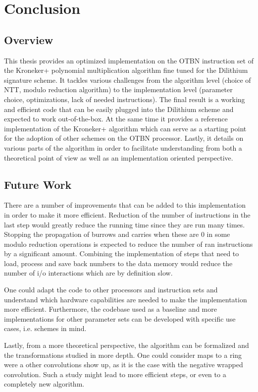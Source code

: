 \chapter{Conclusion}\label{chapter:conclusion}

\section{Overview}

This thesis provides an optimized implementation on the OTBN instruction set of the Kroneker+ polynomial multiplication algorithm fine tuned for the Dilithium signature scheme. It tackles various challenges from the algorithm level (choice of NTT, modulo reduction algorithm) to the implementation level (parameter choice, optimizations, lack of needed instructions). The final result is a working and efficient code that can be easily plugged into the Dilithium scheme and expected to work out-of-the-box. At the same time it provides a reference implementation of the Kroneker+ algorithm which can serve as a starting point for the adoption of other schemes on the OTBN processor. Lastly, it details on various parts of the algorithm in order to facilitate understanding from both a theoretical point of view as well as an implementation oriented perspective. 

\section{Future Work}

There are a number of improvements that can be added to this implementation in order to make it more efficient. Reduction of the number of instructions in the last step would greatly reduce the running time since they are run many times. Stopping the propagation of burrows and carries when these are 0 in some modulo reduction operations is expected to reduce the number of ran instructions by a significant amount. Combining the implementation of steps that need to load, process and save back numbers to the data memory would reduce the number of i/o interactions which are by definition slow.

One could adapt the code to other processors and instruction sets and understand which hardware capabilities are needed to make the implementation more efficient. Furthermore, the codebase used as a baseline and more implementations for other parameter sets can be developed with specific use cases, i.e. schemes in mind. 

Lastly, from a more theoretical perspective, the algorithm can be formalized and the transformations studied in more depth. One could consider maps to a ring were a other convolutions show up, as it is the case with the negative wrapped convolution. Such a study might lead to more efficient steps, or even to a completely new algorithm.